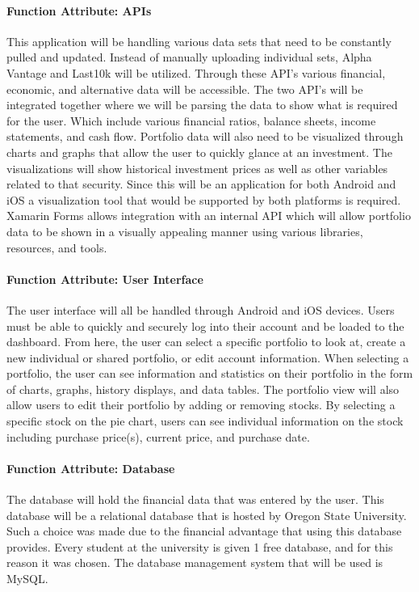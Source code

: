\documentclass[onecolumn, draftclsnofoot,10pt, compsoc]{IEEEtran}
\begin{document}
\paragraph{Function Attribute: APIs}
        This application will be handling various data sets that need to be constantly pulled and updated. Instead of manually uploading individual sets, Alpha Vantage and Last10k will be utilized. Through these API's various financial, economic, and alternative data will be accessible. The two API's will be integrated together where we will be parsing the data to show what is required for the user. Which include various financial ratios, balance sheets, income statements, and cash flow. 
        Portfolio data will also need to be visualized through charts and graphs that allow the user to quickly glance at an investment. The visualizations will show historical investment prices as well as other variables related to that security. Since this will be an application for both Android and iOS a visualization tool that would be supported by both platforms is required. Xamarin Forms allows integration with an internal API which will allow portfolio data to	be shown in a visually appealing manner using various libraries, resources, and tools. 
        
\paragraph{Function Attribute: User Interface}
        The user interface will all be handled through Android and iOS devices. Users must be able to quickly and
        securely log into their account and be loaded to the dashboard. From here, the user can select a specific
        portfolio to look at, create a new individual or shared portfolio, or edit account information.
        When selecting a portfolio, the user can see information and statistics on their portfolio in the 
        form of charts, graphs, history displays, and data tables. The portfolio view will also allow users to edit their
        portfolio by adding or removing stocks. By selecting a specific stock on the
        pie chart, users can see individual information on the stock including purchase price(s), current price,
        and purchase date.
        
\paragraph{Function Attribute: Database}
        The database will hold the financial data that was entered by the user. This database will be a relational database that is hosted by Oregon State University. Such a choice was
        made due to the financial advantage that using this database provides. Every student at the university is given 1 free database, and for this reason it was chosen. The database
        management system that will be used is MySQL.
\end{document}
